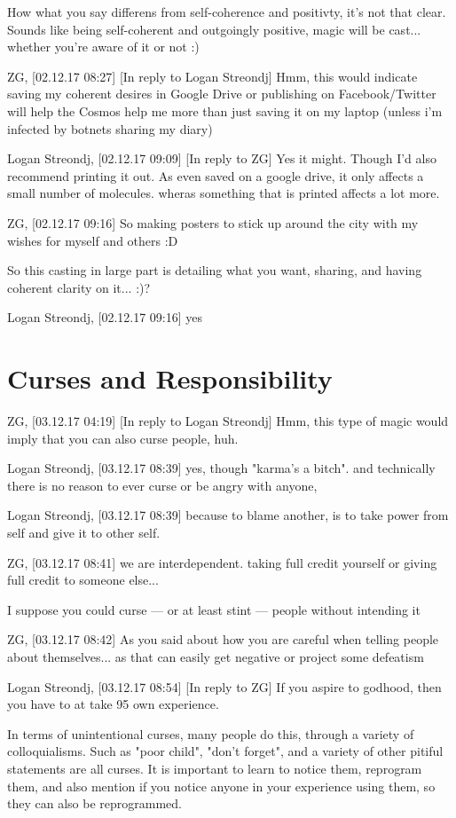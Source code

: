 How what you say differens from self-coherence and positivty, it's not that
clear. Sounds like being self-coherent and outgoingly positive, magic will be
cast... whether you're aware of it or not :)

ZG, [02.12.17 08:27]
[In reply to Logan Streondj]
Hmm, this would indicate saving my coherent desires in Google Drive or
publishing on Facebook/Twitter will help the Cosmos help me more than just
saving it on my laptop (unless i'm infected by botnets sharing my diary)

Logan Streondj, [02.12.17 09:09]
[In reply to ZG]
Yes it might.  Though I'd also recommend printing it out.  As even saved on a
google drive, it only affects a small number of molecules. 
wheras something that is printed affects a lot more.

ZG, [02.12.17 09:16]
So making posters to stick up around the city with my wishes for myself and
others :D

So this casting in large part is detailing what you want, sharing, and having
coherent clarity on it... :)?

Logan Streondj, [02.12.17 09:16]
yes

\section{Curses and Responsibility}
ZG, [03.12.17 04:19]
[In reply to Logan Streondj]
Hmm, this type of magic would imply that you can also curse people, huh.

Logan Streondj, [03.12.17 08:39]
yes, though "karma's a bitch". and technically there is no reason to ever curse
or be angry with anyone,

Logan Streondj, [03.12.17 08:39]
because to blame another, is to take power from self and give it to other self.

ZG, [03.12.17 08:41]
we are interdependent. taking full credit yourself or giving full credit to
someone else... 

I suppose you could curse — or at least stint — people without intending it

ZG, [03.12.17 08:42]
As you said about how you are careful when telling people about themselves... as
that can easily get negative or project some defeatism

Logan Streondj, [03.12.17 08:54]
[In reply to ZG]
If you aspire to godhood, then you have to at take 95%
own experience.

In terms of unintentional curses,  many people do this, through a variety of
colloquialisms.  Such as "poor child", "don't forget", and a variety of other
pitiful statements are all curses.
It is important to learn to notice them, reprogram them, and also mention if you
notice anyone in your experience using them, so they can also be reprogrammed.

